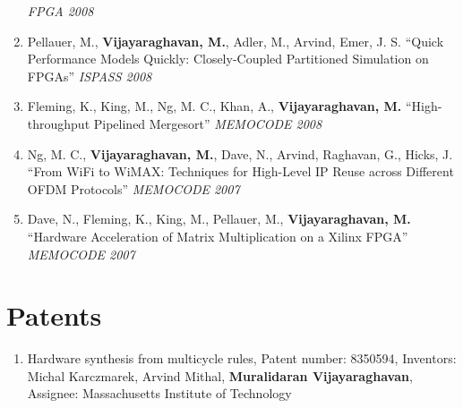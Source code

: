 \documentclass[margin]{resume}
\begin{document}
\begin{resume}
\begin{enumerate}
    \textit{FPGA 2008}
    \item Pellauer, M., \textbf{Vijayaraghavan, M.}, Adler, M., Arvind, Emer,
    J. S. ``Quick Performance Models Quickly: Closely-Coupled Partitioned
    Simulation on FPGAs'' \textit{ISPASS 2008}
    \item Fleming, K., King, M., Ng, M. C., Khan, A., \textbf{Vijayaraghavan, M.} ``High-throughput Pipelined Mergesort'' \textit{MEMOCODE 2008}
    \item Ng, M. C., \textbf{Vijayaraghavan, M.}, Dave, N., Arvind, Raghavan, G., Hicks, J. ``From WiFi to WiMAX: Techniques for High-Level IP Reuse across Different OFDM Protocols'' \textit{MEMOCODE 2007}
    \item Dave, N., Fleming, K., King, M., Pellauer, M., \textbf{Vijayaraghavan, M.} ``Hardware Acceleration of Matrix Multiplication on a Xilinx FPGA'' \textit{MEMOCODE 2007}
    \end{enumerate}

	\section{\mysidestyle Patents}
  \begin{enumerate}
	\item Hardware synthesis from multicycle rules, Patent number: 8350594, Inventors: Michal Karczmarek, Arvind Mithal, \textbf{Muralidaran Vijayaraghavan}, Assignee: Massachusetts Institute of Technology
	\end{enumerate}

%

\end{resume}
\end{document}
